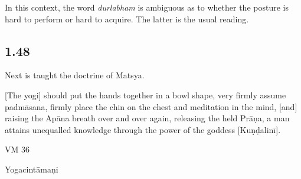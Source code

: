 \begin{ekdosis}
\begin{testimonia}[hp01_047]
\end{testimonia}

\begin{philcomm}[hp01_047]
In this context, the word \emph{durlabham} is ambiguous as to whether the posture is hard to perform or hard to acquire. The latter is the usual reading.
\end{philcomm}

\subsection*{1.48}
\begin{translation}[hp01_048]
Next is taught the doctrine of Matsya.

[The yogi] should put the hands together in a bowl shape, very firmly assume padmāsana, firmly place the chin on the chest and meditation in the mind, [and] raising the Apāna breath over and over again, releasing the held Prāṇa, a man attains unequalled knowledge through the power of the goddess [Kuṇḍalinī].
\end{translation}

\begin{sources}[hp01_048]
VM 36

\begin{versinnote}
\end{versinnote}

\end{sources}

\begin{testimonia}[hp01_048]
Yogacintāmaṇi

\begin{versinnote}
\end{versinnote}


\end{testimonia}
\end{ekdosis}

